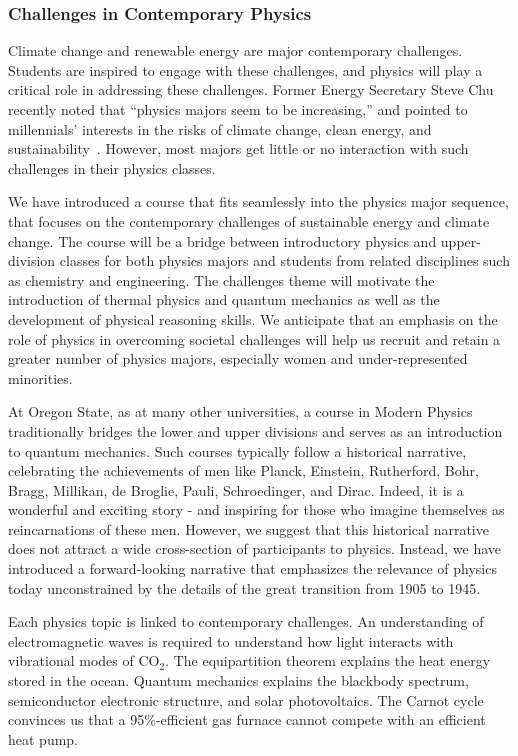 \documentclass[english,aps,pra,reprint,noshowpacs,superscriptaddress]{revtex4-1}
\begin{document}
\subsubsection{Challenges in Contemporary Physics}
Climate change and renewable energy are major contemporary
challenges. Students are inspired to engage with these challenges, and
physics will play a critical role in addressing these challenges.
Former Energy Secretary Steve Chu recently noted that ``physics majors
seem to be increasing,'' and pointed to millennials' interests in the
risks of climate change, clean energy, and
sustainability~\cite{kramer2016gathering}.  However, most majors get
little or no interaction with such challenges in their physics
classes.

We have introduced a course that fits seamlessly into the physics
major sequence, that focuses on the contemporary challenges of
sustainable energy and climate change. The course will be a bridge
between introductory physics and upper-division classes for both
physics majors and students from related disciplines such as chemistry
and engineering. The challenges theme will motivate the introduction
of thermal physics and quantum mechanics as well as the development of
physical reasoning skills. We anticipate that an emphasis on the role
of physics in overcoming societal challenges will help us recruit and
retain a greater number of physics majors, especially women and
under-represented minorities.

At Oregon State, as at many other universities, a course in Modern
Physics traditionally bridges the lower and upper divisions and serves
as an introduction to quantum mechanics. Such courses typically follow
a historical narrative, celebrating the achievements of men like
Planck, Einstein, Rutherford, Bohr, Bragg, Millikan, de Broglie,
Pauli, Schroedinger, and Dirac. Indeed, it is a wonderful and exciting
story - and inspiring for those who imagine themselves as
reincarnations of these men. However, we suggest that this historical
narrative does not attract a wide cross-section of participants to
physics. Instead, we have introduced a forward-looking narrative that
emphasizes the relevance of physics today unconstrained by the details
of the great transition from 1905 to 1945.

Each physics topic is linked to contemporary challenges. An
understanding of electromagnetic waves is required to understand how
light interacts with vibrational modes of CO$_2$. The equipartition
theorem explains the heat energy stored in the ocean. Quantum
mechanics explains the blackbody spectrum, semiconductor electronic
structure, and solar photovoltaics. The Carnot cycle convinces us that
a 95\%-efficient gas furnace cannot compete with an efficient heat
pump.
\end{document}
